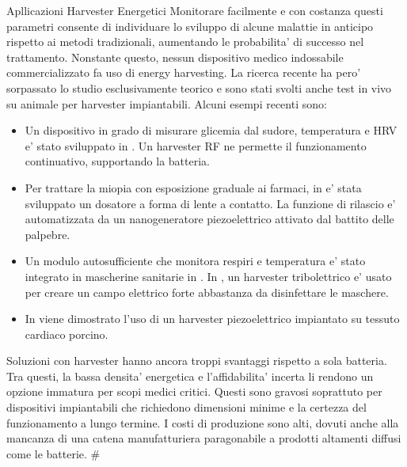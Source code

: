 \begin{multicols}{2}
\begin{section}{Apllicazioni Harvester Energetici}
    Monitorare facilmente e con costanza questi parametri consente di individuare lo sviluppo di alcune malattie in anticipo rispetto ai metodi tradizionali, aumentando le probabilita' di successo nel trattamento. Nonstante questo, nessun dispositivo medico indossabile commercializzato fa uso di energy harvesting. La ricerca recente ha pero' sorpassato lo studio esclusivamente teorico e sono stati svolti anche test in vivo su animale per harvester impiantabili. Alcuni esempi recenti sono: \begin{itemize}
        \item Un dispositivo in grado di misurare glicemia dal sudore, temperatura e HRV e' stato sviluppato in \cite{mirlouContinuousGlycemicMonitoring2024}. Un harvester RF ne permette il funzionamento continuativo, supportando la batteria.
        \item Per trattare la miopia con esposizione graduale ai farmaci, in \cite{jiangSelfgeneratedElectricitydrivenDrug2024} e' stata sviluppato un dosatore a forma di lente a contatto. La funzione di rilascio e' automatizzata da un nanogeneratore piezoelettrico attivato dal battito delle palpebre.
        \item Un modulo autosufficiente che monitora respiri e temperatura e' stato integrato in mascherine sanitarie in \cite{lanHighefficientIntelligentAntibacterial2024}. In \cite{simInstantDisinfectingFace}, un harvester tribolettrico e' usato per creare un campo elettrico forte abbastanza da disinfettare le maschere.
        \item In \cite{PanVivoFlexibleEnergy2024} viene dimostrato l'uso di un harvester piezoelettrico impiantato su tessuto cardiaco porcino.
    \end{itemize}
 
    Soluzioni con harvester hanno ancora troppi svantaggi rispetto a sola batteria. Tra questi, la bassa densita' energetica e l'affidabilita' incerta li rendono un opzione immatura per scopi medici critici. Questi sono gravosi soprattuto per dispositivi impiantabili che richiedono dimensioni minime e la certezza del funzionamento a lungo termine. I costi di produzione sono alti, dovuti anche alla mancanza di una catena manufatturiera paragonabile a prodotti altamenti diffusi come le batterie. \#


\end{section}
\end{multicols}
